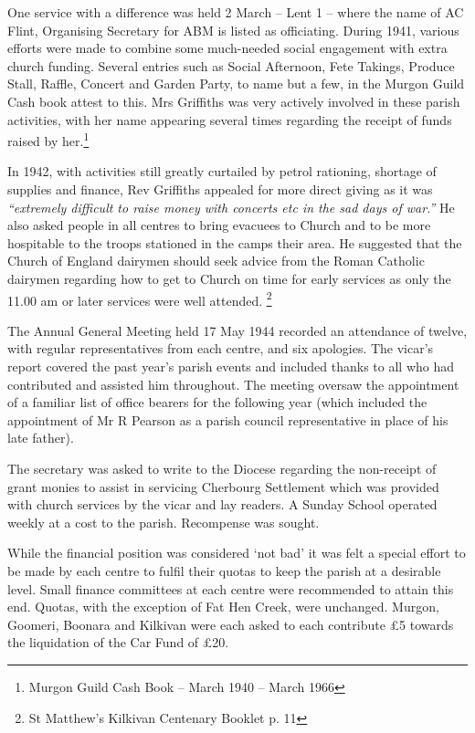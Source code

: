 One service with a difference was held 2 March -- Lent 1 -- where the name of AC Flint, Organising Secretary for ABM is listed as officiating. During 1941, various efforts were made to combine some much-needed social engagement with extra church funding. Several entries such as Social Afternoon, Fete Takings, Produce Stall, Raffle, Concert and Garden Party, to name but a few, in the Murgon Guild Cash book attest to this. Mrs Griffiths was very actively involved in these parish activities, with her name appearing several times regarding the receipt of funds raised by her.\footnote{Murgon Guild Cash Book -- March 1940 -- March 1966}


In 1942, with activities still greatly curtailed by petrol rationing, shortage of supplies and finance, Rev Griffiths appealed for more direct giving as it was \emph{``extremely difficult to raise money with concerts etc in the sad days of war.''} He also asked people in all centres to bring evacuees to Church and to be more hospitable to the troops stationed in the camps their area. He suggested that the Church of England dairymen should seek advice from the Roman Catholic dairymen regarding how to get to Church on time for early services as only the 11.00 am or later services were well attended. \footnote{St Matthew's Kilkivan Centenary Booklet p. 11}


The Annual General Meeting held 17 May 1944 recorded an attendance of twelve, with regular representatives from each centre, and six apologies. The vicar's report covered the past year's parish events and included thanks to all who had contributed and assisted him throughout. The meeting oversaw the appointment of a familiar list of office bearers for the following year (which included the appointment of Mr R Pearson as a parish council representative in place of his late father).



The secretary was asked to write to the Diocese regarding the non-receipt of grant monies to assist in servicing Cherbourg Settlement which was provided with church services by the vicar and lay readers. A Sunday School operated weekly at a cost to the parish. Recompense was sought.



While the financial position was considered `not bad' it was felt a special effort to be made by each centre to fulfil their quotas to keep the parish at a desirable level. Small finance committees at each centre were recommended to attain this end. Quotas, with the exception of Fat Hen Creek, were unchanged. Murgon, Goomeri, Boonara and Kilkivan were each asked to each contribute \pounds5 towards the liquidation of the Car Fund of \pounds20.




